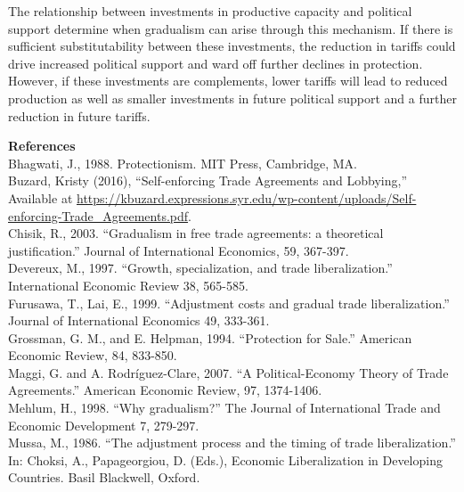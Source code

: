 \documentclass[12pt]{article}
\begin{document}
The relationship between investments in productive capacity and political support determine when gradualism can arise through this mechanism. If there is sufficient substitutability between these investments, the reduction in tariffs could drive increased political support and ward off further declines in protection. However, if these investments are complements, lower tariffs will lead to reduced production as well as smaller investments in future political support and a further reduction in future tariffs.
				

\newpage
\noindent\large\textbf{References}\\

\noindent\normalsize Bhagwati, J., 1988. Protectionism. MIT Press, Cambridge, MA. \\

\noindent Buzard, Kristy (2016), ``Self-enforcing Trade Agreements and Lobbying,'' Available at \url{https://kbuzard.expressions.syr.edu/wp-content/uploads/Self-enforcing-Trade_Agreements.pdf}. \\

\noindent Chisik, R., 2003. ``Gradualism in free trade agreements: a theoretical justification.'' Journal of International Economics, 59, 367-397. \\

\noindent Devereux, M., 1997. ``Growth, specialization, and trade liberalization.'' International Economic Review
38, 565-585. \\

\noindent Furusawa, T., Lai, E., 1999. ``Adjustment costs and gradual trade liberalization.'' Journal of International
Economics 49, 333-361. \\

\noindent Grossman, G. M., and E. Helpman, 1994. ``Protection for Sale.'' American Economic Review, 84, 833-850. \\

\noindent Maggi, G. and A. Rodr\'{i}guez-Clare, 2007. ``A Political-Economy Theory of Trade Agreements.'' American Economic Review, 97, 1374-1406. \\

\noindent Mehlum, H., 1998. ``Why gradualism?'' The Journal of International Trade and Economic Development 7, 279-297. \\

\noindent Mussa, M., 1986. ``The adjustment process and the timing of trade liberalization.'' In: Choksi, A., Papageorgiou, D. (Eds.), Economic Liberalization in Developing Countries. Basil Blackwell, Oxford. \\
\end{document}
